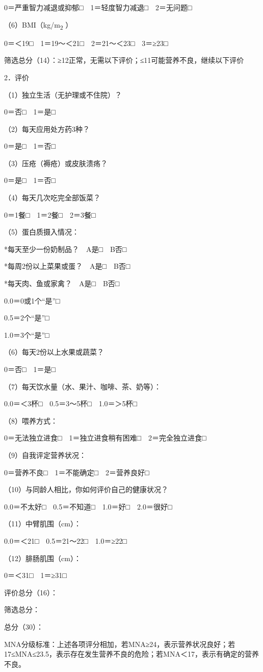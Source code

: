 0＝严重智力减退或抑郁□　1＝轻度智力减退□　2＝无问题□

（6）BMI（kg/m\textsubscript{2} ）

0＝＜19□　1＝19～＜21□　2＝21～＜23□　3＝≥23□

筛选总分（14）：≥12正常，无需以下评价；≤11可能营养不良，继续以下评价

2．评价

（1）独立生活（无护理或不住院）？

0＝否□　1＝是□

（2）每天应用处方药3种？

0＝是□　1＝否□

（3）压疮（褥疮）或皮肤溃疡？

0＝是□　1＝否□

（4）每天几次吃完全部饭菜？

0＝1餐□　1＝2餐□　2＝3餐□

（5）蛋白质摄入情况：

*每天至少一份奶制品？　A是□　B否□

*每周2份以上菜果或蛋？　A是□　B否□

*每天肉、鱼或家禽？　A是□　B否□

0.0＝0或1个“是”□

0.5＝2个“是”□

1.0＝3个“是”□

（6）每天2份以上水果或蔬菜？

0＝否□　1＝是□

（7）每天饮水量（水、果汁、咖啡、茶、奶等）：

0.0＝＜3杯□　0.5＝3～5杯□　1.0＝＞5杯□

（8）喂养方式：

0＝无法独立进食□　1＝独立进食稍有困难□　2＝完全独立进食□

（9）自我评定营养状况：

0＝营养不良□　1＝不能确定□　2＝营养良好□

（10）与同龄人相比，你如何评价自己的健康状况？

0.0＝不太好□　0.5＝不知道□　1.0＝好□　2.0＝很好□

（11）中臂肌围（cm）：

0.0＝＜21□　0.5＝21～22□　1.0＝≥22□

（12）腓肠肌围（cm）：

0＝＜31□　1＝≥31□

评价总分（16）：

筛选总分：

总分（30）：

MNA分级标准：上述各项评分相加，若MNA≥24，表示营养状况良好；若17≤MNA≤23.5，表示存在发生营养不良的危险；若MNA＜17，表示有确定的营养不良。

